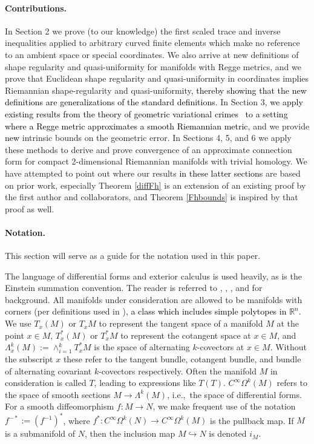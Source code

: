 \documentclass[11pt]{article}
\newcommand{\correction}[2]{\textcolor{red}{}\textcolor{black}{#2}}
\begin{document}
\paragraph{Contributions.}
In Section 2 we prove (to our knowledge) the first scaled trace and inverse inequalities applied to arbitrary curved finite elements which make no reference to an ambient space or special coordinates. We also arrive at new definitions of shape regularity and quasi-uniformity for manifolds with Regge metrics, and we prove that Euclidean shape regularity and quasi-uniformity in coordinates implies Riemannian shape-regularity and quasi-uniformity\correction{}{, thereby showing that the new definitions are generalizations of the standard definitions}. In Section 3, \correction{we specialize FEEC methods to the situation where a Regge metric is used to approximate a smooth Riemannian metric}{we apply existing results from the theory of geometric variational crimes~\cite{Holst-Stern} to a setting where a Regge metric approximates a smooth Riemannian metric}, and we provide \correction{}{new} intrinsic bounds on the geometric error. In Sections 4, 5, and 6 we apply these methods to derive and prove convergence of an approximate connection form for compact 2-dimensional Riemannian manifolds with trivial homology. We have attempted to point out where our results \correction{}{in these latter sections} are based on prior work, especially Theorem \ref{diffFh} is an extension of an existing proof by the first author and collaborators, and Theorem \ref{Fhbounds} is inspired by that proof as well. 

\paragraph{Notation.}
This section will serve as a guide for the notation used in this paper.

The language of differential forms and exterior calculus is used heavily, as is the Einstein summation convention. The reader is referred to \cite{Darling}, \cite{Flanders}, \cite{Marsden}, and \cite{deRham} for background. All manifolds under consideration are allowed to be manifolds with corners (per definitions used in \cite{Knapp})\correction{}{, a class which includes simple polytopes in $\mathbb{R}^n$}. We use $T_x(M)$ or $T_xM$ to represent the tangent space of a manifold $M$ at the point $x \in M$, $T^*_x(M)$ or $T^*_xM$ to represent the cotangent space at $x \in M$, and $\Lambda^k_x(M) := \wedge_{i = 1}^k T^*_xM$ is the space of alternating $k$-covectors at $x \in M$. Without the subscript $x$ these refer to the tangent bundle, cotangent bundle, and bundle of alternating covariant $k$-covectors respectively. Often the manifold $M$ in consideration is called $T$, leading to expressions like $T(T)$. $C^\infty\Omega^k(M)$ refers to the space of smooth sections $M \to \Lambda^k(M)$, i.e.,~the space of differential forms. For a smooth diffeomorphism $f: M \to N$, we make frequent use of the notation $f^{-*} := (f^{-1})^*$, where $f^*: C^\infty\Omega^k(N) \to C^\infty\Omega^k(M)$ is the pullback map.  If $M$ is a submanifold of $N$, then the inclusion map $M \hookrightarrow N$ is denoted $i_M$.
\end{document}
